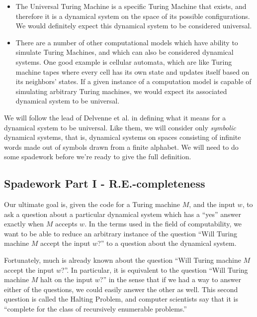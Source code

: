 \documentclass{fkpaper}
\begin{document}
\begin{multicols}{2}
\begin{itemize}
    \item The Universal Turing Machine is a specific Turing Machine that
      exists, and therefore it is a dynamical system on the space of its
      possible configurations. We would definitely expect this dynamical
      system to be considered universal.

    \item There are a number of other computational models which have
      ability to simulate Turing Machines, and which can also be
      considered dynamical systems. One good example is cellular
      automata, which are like Turing machine tapes where every cell has
      its own state and updates itself based on its neighbors' states.
      If a given instance of a computation model is capable of
      simulating arbitrary Turing machines, we would expect its
      associated dynamical system to be universal.

  \end{itemize}

  We will follow the lead of Delvenne et al. \cite{Delvenne2004Apr} in
  defining what it means for a dynamical system to be universal. Like
  them, we will consider only {\it symbolic} dynamical systems, that is,
  dynamical systems on spaces consisting of infinite words made out of
  symbols drawn from a finite alphabet. We will need to do some
  spadework before we're ready to give the full definition.

  \subsection{Spadework Part I - R.E.-completeness}

  Our ultimate goal is, given the code for a Turing machine $M$, and the
  input $w$, to ask a question about a particular dynamical system which
  has a ``yes'' answer exactly when $M$ accepts $w$. In the terms used
  in the field of computability, we want to be able to reduce an
  arbitrary instance of the question ``Will Turing machine $M$ accept
  the input $w$?'' to a question about the dynamical system.

  Fortunately, much is already known about the question ``Will Turing
  machine $M$ accept the input $w$?''. In particular, it is equivalent
  to the question ``Will Turing machine $M$ halt on the input $w$?'' in
  the sense that if we had a way to answer either of the questions, we
  could easily answer the other as well. This second question is called
  the Halting Problem, and computer scientists say that it is ``complete
  for the class of recursively enumerable problems.''


\end{multicols}
\end{document}

